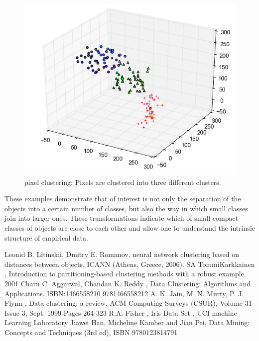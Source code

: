 \documentclass[letterpaper, 10 pt, conference]{ieeeconf}  %
\begin{document}
\begin{figure}[H]
\includegraphics[width=\columnwidth]{figure_2.png}
\caption{pixel clustering: Pixels are clustered into three different clusters.}
\end{figure}
These examples demonstrate that of interest is not only the separation of the objects into a certain number of classes, but also the way in which small classes join into larger ones. These transformations indicate which of small compact classes of objects are close to each other and allow one to understand the intrinsic structure of empirical data. 


\addtolength{\textheight}{-12cm}   %


\begin{thebibliography}{99}

 Leonid B. Litinskii, Dmitry E. Romanov, neural network clustering based on distances between objects, ICANN (Athens, Greece, 2006).
 SA TommiKarkkainen , Introduction to partitioning-based clustering
methods with a robust example.	2001
 Charu C. Aggarwal, Chandan K. Reddy , Data Clustering: Algorithms and Applications. ISBN:1466558210 9781466558212
 A. K. Jain, M. N. Murty, P. J. Flynn , Data clustering: a review.
ACM Computing Surveys (CSUR), Volume 31 Issue 3, Sept. 1999 Pages 264-323 
 R.A. Fisher , Iris Data Set , UCI machine Learning Laboratory
 Jiawei Han, Micheline Kamber and Jian Pei, Data Mining: Concepts and Techniques (3rd ed), ISBN 9780123814791
 

\end{thebibliography}
\end{document}
